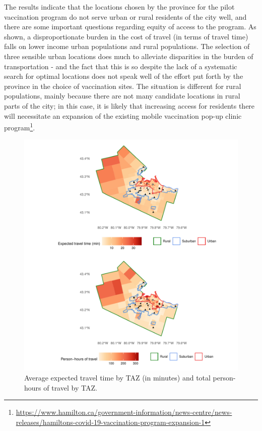 \documentclass[]{elsarticle} %
\begin{document}
The results indicate that the locations chosen by the province for the
pilot vaccination program do not serve urban or rural residents of the
city well, and there are some important questions regarding equity of
access to the program. As shown, a disproportionate burden in the cost
of travel (in terms of travel time) falls on lower income urban
populations and rural populations. The selection of three sensible urban
locations does much to alleviate disparities in the burden of
transportation - and the fact that this is so despite the lack of a
systematic search for optimal locations does not speak well of the
effort put forth by the province in the choice of vaccination sites. The
situation is different for rural populations, mainly because there are
not many candidate locations in rural parts of the city; in this case,
it is likely that increasing access for residents there will necessitate
an expansion of the existing mobile vaccination pop-up clinic
program\footnote{\url{https://www.hamilton.ca/government-information/news-centre/news-releases/hamiltons-covid-19-vaccination-program-expansion-1}}.

\begin{figure}

{\centering \includegraphics{Accessibility-Vaccination-Sites-Hamilton_files/figure-latex/figure-maps-baseline-1} 

}

\caption{\label{fig:maps-baseline}Average expected travel time by TAZ (in minutes) and total person-hours of travel by TAZ.}\label{fig:figure-maps-baseline}
\end{figure}
\end{document}
